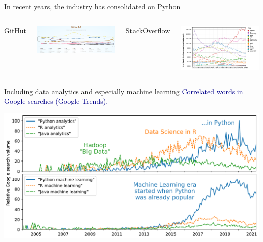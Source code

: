 \documentclass[aspectratio=169]{beamer}
\begin{document}
\begin{frame}{In recent years, the industry has consolidated on Python}
\vspace{0.25 cm}
\begin{columns}[t]
\centering GitHut

\vspace{0.1 cm}
\includegraphics[width=\linewidth]{PLOTS/python-rankings-githut-2022.png}

\centering StackOverflow

\vspace{0.1 cm}
\includegraphics[width=\linewidth]{PLOTS/python-rankings-stackoverflow-2022.png}
\end{columns}
\end{frame}

\begin{frame}{Including data analytics and especially machine learning}
\large
\vspace{0.25 cm}
\textcolor{darkblue}{Correlated words in Google searches (Google Trends).}

\vspace{0.15 cm}
\includegraphics[width=\linewidth]{PLOTS/analytics-by-language.pdf}
\end{frame}
\end{document}
